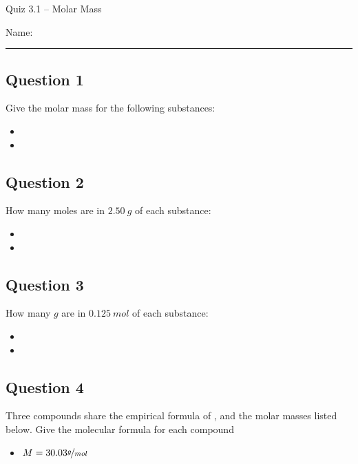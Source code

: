 \documentclass[11pt, letterpaper]{memoir}
\begin{document}
	\begin{center}
		{\large	Quiz 3.1 --  Molar Mass}
	\end{center}
{\large Name: \rule[-1mm]{4in}{.1pt}
	
	\subsection*{Question 1}
	Give the molar mass for the following substances:
	\begin{itemize}
		\item \vspace{0.5em} 
		\item \vspace{0.75em} 
	\end{itemize}
	
	\vspace{0.5em}
	\subsection*{Question 2}
	How many moles are in $2.50~g$ of each substance:
	\begin{itemize}
		\item \vspace{0.5em} 
		\item \vspace{0.75em} 
	\end{itemize}
	
	
	\vspace{0.5em}
	\subsection*{Question 3}
	How many $g$ are in $0.125~mol$ of each substance:
	\begin{itemize}
		\item \vspace{0.5em} 
		\item \vspace{0.75em} 
	\end{itemize}

	\vspace{0.5em}
	\subsection*{Question 4}
  Three compounds share the empirical formula of , and the molar masses listed below. Give the molecular formula for each compound
  \begin{itemize}
    \item $M=30.03\nicefrac{g}{mol}$


\end{itemize}}
\end{document}
